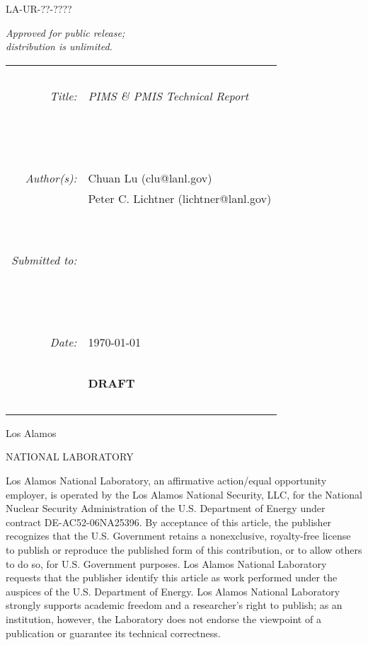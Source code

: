 \documentclass[12pt]{article}
\newcommand{\bc}{\begin{center}}
\newcommand{\ec}{\end{center}}
\begin{document}


\noindent
{\large\sffamily LA-UR-??-????}

\medskip

\noindent
\scriptsize
{\em Approved for public release;}\\
{\em distribution is unlimited.}

\normalsize

\bc
\begin{tabular}{r|l}
~ & ~\\
{\em Title:} & {\sl PIMS \& PMIS Technical Report}\\
~ & ~\\
~ & ~\\
~ & ~\\
{\em Author(s):} & Chuan Lu (clu@lanl.gov)\\
~ & Peter C. Lichtner (lichtner@lanl.gov)\\
~ & ~\\
~ & ~\\
{\em Submitted to:} & \\
~ & ~\\
~ & ~\\
~ & ~\\
{\em Date:} & \today \\
~ & ~\\
~ & {\bf \large DRAFT}\\
~ & ~\\
\end{tabular}
\ec

\vfill

\noindent
{\Huge\sffamily Los Alamos}

\vspace{-8pt}

\noindent
{\sffamily NATIONAL LABORATORY}

\vspace{-6pt}

\noindent
\scriptsize
Los Alamos National Laboratory, an affirmative action/equal opportunity employer, is operated by the Los Alamos National Security, LLC, for the National Nuclear Security Administration of the U.S. Department of Energy under contract DE-AC52-06NA25396. By acceptance of this article, the publisher recognizes that the U.S. Government retains a nonexclusive, royalty-free license to publish or reproduce the published form of this contribution, or to allow others to do so, for U.S. Government purposes. Los Alamos National Laboratory requests that the publisher identify this article as work performed under the auspices of the U.S. Department of Energy. Los Alamos National Laboratory strongly supports academic freedom and a researcher's right to publish; as an institution, however, the Laboratory does not endorse the viewpoint of a publication or guarantee its technical correctness.
\end{document}
